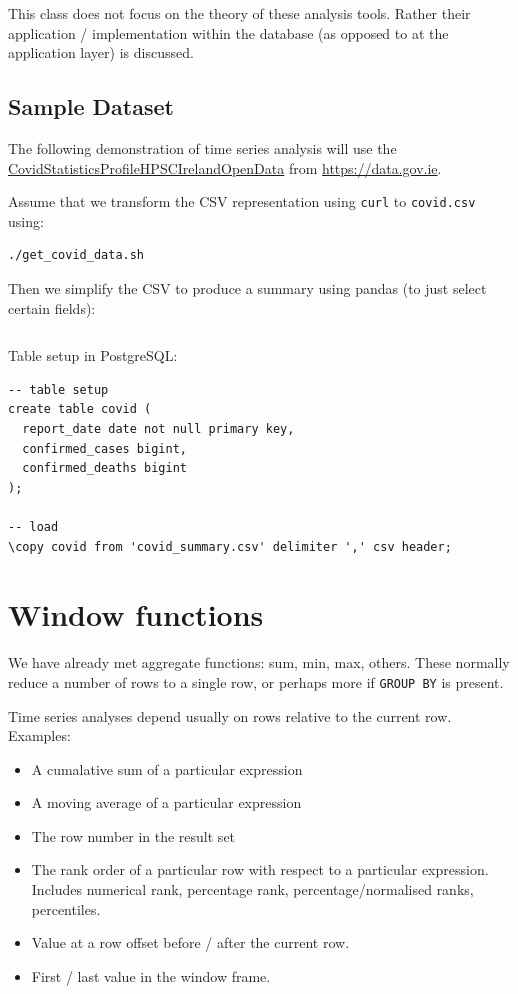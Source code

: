 \documentclass{pgnotes}
\begin{document}
This class does not focus on the theory of these analysis tools.
Rather their application / implementation within the database (as opposed to at the application layer) is discussed.

\subsection{Sample Dataset}

The following demonstration of time series analysis will use the \href{https://data.gov.ie/dataset/covidstatisticsprofilehpscirelandopendata1}{CovidStatisticsProfileHPSCIrelandOpenData} from \url{https://data.gov.ie}.

Assume that we transform the CSV representation using \texttt{curl} to \texttt{covid.csv} using:
\begin{verbatim}
./get_covid_data.sh
\end{verbatim}

Then we simplify the CSV to produce a summary using pandas (to just select certain fields):
\inputminted{python}{summarise_covid_data.py}

Table setup in PostgreSQL:
\begin{verbatim}
-- table setup
create table covid ( 
  report_date date not null primary key,
  confirmed_cases bigint,
  confirmed_deaths bigint
);

-- load
\copy covid from 'covid_summary.csv' delimiter ',' csv header;
\end{verbatim}

\section{Window functions}

We have already met aggregate functions: sum, min, max, others. 
These normally reduce a number of rows to a single row, or perhaps more if \texttt{GROUP BY} is present.

Time series analyses depend usually on rows relative to the current row. 
Examples:
\begin{itemize}
\item A cumalative sum of a particular expression
\item A moving average of a particular expression
\item The row number in the result set
\item The rank order of a particular row with respect to a particular expression. Includes numerical rank, percentage rank, percentage/normalised ranks, percentiles.
\item Value at a row offset before / after the current row.
\item First / last value in the window frame. 
\end{itemize}
\end{document}
